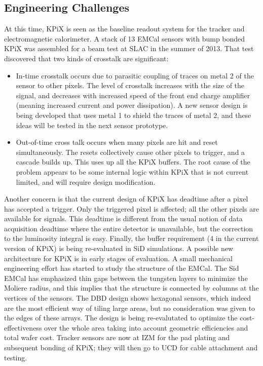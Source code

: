 \subsection{Engineering Challenges}
At this time, KPiX is seen as the baseline readout system for the tracker and electromagnetic calorimeter. A stack of 13 EMCal sensors with bump bonded KPiX was assembled for a beam test at SLAC in the summer of 2013. That test discovered that two kinds of crosstalk are significant:
\begin{itemize}
	\item In-time crosstalk occurs due to parasitic coupling of traces on metal 2 of the sensor to other pixels. The level of crosstalk increases with the size of the signal, and decreases with increased speed of the front end charge amplifier (meaning increased current and power dissipation).  A new sensor design is being developed that uses metal 1 to shield the traces of metal 2, and these ideas will be tested in the next sensor prototype.
	\item Out-of-time cross talk occurs when many pixels are hit and reset simultaneously. The resets collectively cause other pixels to trigger, and a cascade builds up. This uses up all the KPiX buffers. The root cause of the problem appears to be some internal logic within KPiX that is not current limited, and will require design modification.
\end{itemize}


Another concern is that the current design of KPiX has deadtime after a pixel has accepted a trigger. Only the triggered pixel is affected; all the other pixels are available for signals. This deadtime is different from the usual notion of data acquisition deadtime where the entire detector is unavailable, but the correction to the luminosity integral is easy. Finally, the buffer requirement (4 in the current version of KPiX) is being re-evaluated in SiD simulations. A possible new architecture for KPiX is in early stages of evaluation.
A small mechanical engineering effort has started to study the structure of the EMCal. The Sid EMCal has emphasized thin gaps between the tungsten layers to minimize the Moliere radius, and this implies that the structure is connected by columns at the vertices of the sensors. The DBD design shows hexagonal sensors, which indeed are the most efficient way of tiling large areas, but no consideration was given to the edges of these arrays. The design is being re-evalutated to optimize the cost-effectiveness over the whole area taking into account geometric efficiencies and total wafer cost.
Tracker sensors are now at IZM for the pad plating and subsequent bonding of KPiX; they will then go to UCD for cable attachment and testing.


